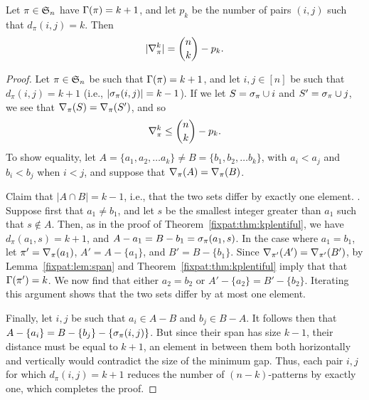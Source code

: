   \begin{theorem} \label{fixpat:thm:gappairs}
    Let $\pi \in \S_{n}$ have $\Gam(\pi) = k + 1$, and let $p_k$ be the number
    of pairs $(i,j)$ such that $d_\pi(i,j) = k$. Then 
    $$ | \delpik | = \binom{n}{k} - p_k.$$
  \end{theorem}
  \begin{proof}
    Let $\pi \in \S_n$ be such that $\Gam(\pi) = k+1$, and let $i,j \in [n]$ be
    such that $d_\pi(i,j) = k+1$ (i.e., $|\pspan_\pi(i,j)| = k-1$). If we let
    $S = \pspan_\pi \cup i$ and $S' = \pspan_\pi \cup j$, we see that
    $\delpi(S) = \delpi(S')$, and so 
    $$\delpik \leq \binom{n}{k} - p_k. $$
    To show equality, let $A = \{a_1, a_2, \dots a_k\} \neq B = \{b_1, b_2,
    \dots b_k\}$, with $a_i < a_j$ and $b_i < b_j$ when $i < j$, and suppose
    that $\delpi(A) = \delpi(B)$. 
    
    Claim that $|A \cap B| = k-1$, i.e., that the two sets differ by exactly
    one element. .  Suppose first that $a_1 \neq b_1$, and let $s$ be the
    smallest integer greater than $a_1$ such that $s \notin A$. Then, as in the
    proof of Theorem~\ref{fixpat:thm:kplentiful}, we have $d_\pi(a_1, s) = k+1$, and
    $A - {a_1} = B - {b_1} = \pspan_\pi(a_1, s)$.  In the case where $a_1 =
    b_1$, let $\pi' = \delpi(a_1)$, $A' = A - \{a_1\}$, and $B' = B -
    \{b_1\}$. Since $\del_{\pi'} (A') = \del_{\pi'}(B')$, by
    Lemma~\ref{fixpat:lem:span} and Theorem~\ref{fixpat:thm:kplentiful} imply that that
    $\Gam(\pi') = k$. We now find that either $a_2 = b_2$ or $A' - \{a_2\} =
    B' - \{b_2\}$. Iterating this argument shows that the two sets differ by
    at most one element. 

    Finally, let $i,j$ be such that $a_i \in A - B$ and $b_j \in B - A$. It
    follows then that $ A-\{a_i\} = B - \{b_j\} - \{\pspan_\pi(i,j) \}$. But
    since their span has size $k-1$, their distance must be equal to $k+1$,
    an element in between them both horizontally and vertically would
    contradict the size of the minimum gap. Thus, each pair $i,j$ for which
    $d_\pi(i,j) = k+1$ reduces the number of $(n-k)$-patterns by exactly one,
    which completes the proof. 
  \end{proof}





    

      

